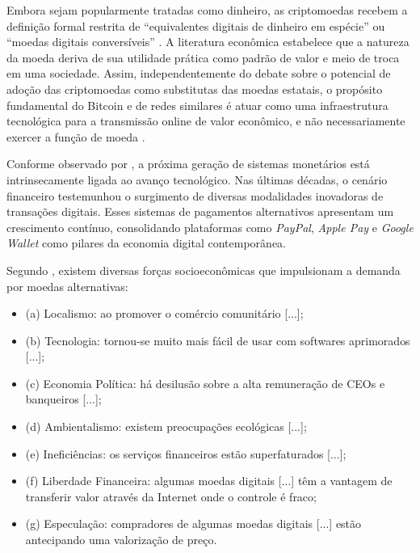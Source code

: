 \documentclass[
    12pt,                %
    openright,           %
    oneside,             %
    a4paper,             %
    english,             %
    brazil               %
]{abntex2}
\begin{document}
Embora sejam popularmente tratadas como dinheiro, as criptomoedas recebem a definição formal restrita de 
``equivalentes digitais de dinheiro em espécie'' ou ``moedas digitais conversíveis'' \cite{papadopoulos2024blockchain}.  
A literatura econômica estabelece que a natureza da moeda deriva de sua utilidade prática como padrão de valor e meio 
de troca em uma sociedade. Assim, independentemente do debate sobre o potencial de adoção das criptomoedas como 
substitutas das moedas estatais, o propósito fundamental do Bitcoin e de redes similares é atuar como uma infraestrutura 
tecnológica para a transmissão online de valor econômico, e não necessariamente 
exercer a função de moeda \cite{papadopoulos2024blockchain}.

Conforme observado por , a próxima geração de sistemas monetários está intrinsecamente ligada ao avanço tecnológico. Nas últimas décadas, 
o cenário financeiro testemunhou o surgimento de diversas modalidades inovadoras de transações digitais. Esses sistemas de pagamentos alternativos apresentam 
um crescimento contínuo, consolidando plataformas como \textit{PayPal}, \textit{Apple Pay} e \textit{Google Wallet} como pilares da economia digital contemporânea.

Segundo , existem diversas forças socioeconômicas que impulsionam a demanda por moedas alternativas:
\begin{citacao}
    \begin{itemize}
        \item (a) Localismo: ao promover o comércio comunitário [...]; 
	    \item (b) Tecnologia: tornou-se muito mais fácil de usar com softwares aprimorados [...]; 
	    \item (c) Economia Política: há desilusão sobre a alta remuneração de CEOs e banqueiros [...]; 
	    \item (d) Ambientalismo: existem preocupações ecológicas [...]; 
        \item (e) Ineficiências: os serviços financeiros estão superfaturados [...];
	    \item (f) Liberdade Financeira: algumas moedas digitais [...] têm a vantagem de transferir valor através da Internet onde o controle é fraco; 
	    \item (g) Especulação: compradores de algumas moedas digitais [...] estão antecipando uma valorização de preço.
    \end{itemize}
\end{citacao}
\end{document}
